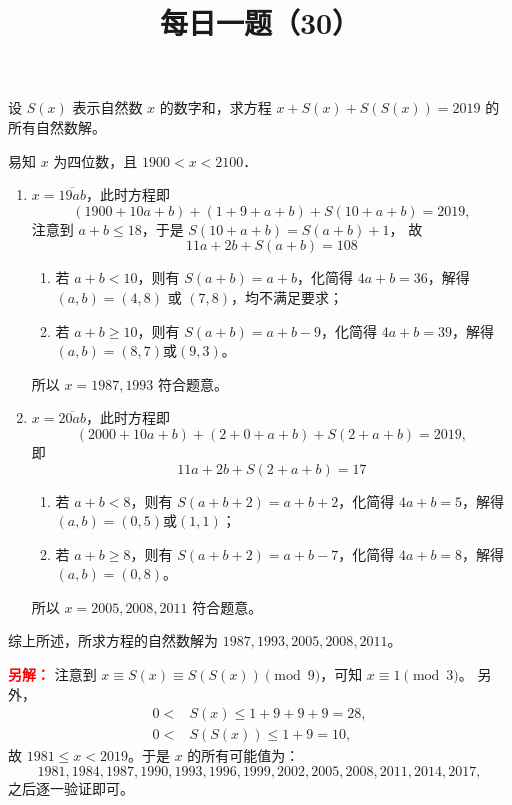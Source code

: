 \documentclass[a4paper]{exam}
\title{\huge \heiti \color{dblue} 每日一题（30）\\\pgfornament[scale=0.4]{84}}
\author{}
\date{}
\begin{document}
\maketitle

\thispagestyle{headandfoot}


\begin{questions}

\setcounter{question}{29}

\question
设 $S(x)$ 表示自然数 $x$ 的数字和，求方程 $x+S(x)+S\left(S\left(x\right)\right)=2019$ 的所有自然数解。

\begin{solution}[\stretch{1}]
    易知 $x$ 为四位数，且 $1900<x<2100$．

    \begin{enumerate}[label={(\arabic*)}]
        \item $x=\overline{19ab}$，此时方程即 \[(1900+10a+b)+(1+9+a+b)+S(10+a+b)=2019,\]
        注意到 $a+b \leqslant 18$，于是 $S(10+a+b)=S(a+b)+1$，
        故 \[11a+2b+S(a+b)=108\]
        \begin{enumerate}[label={(\roman*)}]
            \item 若 $a+b<10$，则有 $S(a+b)=a+b$，化简得 $4a+b=36$，解得 $(a,b)=(4,8) \text{~或~} (7,8)$，均不满足要求；
            \item 若 $a+b\geqslant 10$，则有 $S(a+b)=a+b-9$，化简得 $4a+b=39$，解得 $(a,b)=(8,7) \text{或} (9,3)$。
        \end{enumerate}
        所以 $x=1987,1993$ 符合题意。
        \item $x=\overline{20ab}$，此时方程即\[(2000+10a+b)+(2+0+a+b)+S(2+a+b)=2019,\]即\[11a+2b+S(2+a+b)=17\]
        \begin{enumerate}[label={\roman*)}]
            \item 若 $a+b<8$，则有 $S(a+b+2)=a+b+2$，化简得 $4a+b=5$，解得 $(a,b)=(0,5) \text{或} (1,1)$；
            \item 若 $a+b\geqslant 8$，则有 $S(a+b+2)=a+b-7$，化简得 $4a+b=8$，解得 $(a,b)=(0,8)$。
        \end{enumerate}
        所以 $x=2005,2008,2011$ 符合题意。
    \end{enumerate}

    综上所述，所求方程的自然数解为 $1987,1993,2005,2008,2011$。

    \textcolor{red}{\textbf{另解：}}
    注意到 $x \equiv S(x) \equiv S\left(S\left(x\right)\right) \pmod{9}$，可知 $x \equiv 1 \pmod{3}$。
    另外，
    \[
        \begin{aligned}
            0<&S(x)\leqslant 1+9+9+9=28, \\
            0<&S\left(S\left(x\right)\right)\leqslant 1+9=10,
        \end{aligned}
    \]
    故 $1981\leqslant x < 2019$。于是 $x$ 的所有可能值为：
    \[1981,1984,1987,1990,1993,1996,1999,2002,2005,2008,2011,2014,2017,\]
    之后逐一验证即可。
\end{solution}

\end{questions}
\end{document}
